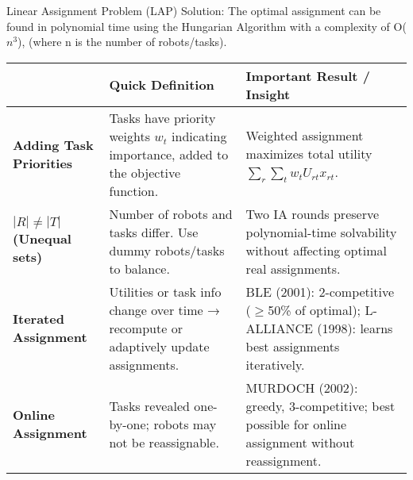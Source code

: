 Linear Assignment Problem (LAP) Solution: The optimal assignment can be found in polynomial time using the Hungarian Algorithm with a complexity of O($n^3$), (where n is the number of robots/tasks).

\begin{table}[h!]
\centering
\renewcommand{\arraystretch}{1.2}
\begin{tabularx}{\textwidth}{@{}p{2.5cm}|p{6.7cm}|X@{}}
\toprule
 & \textbf{Quick Definition} & \textbf{Important Result / Insight} \\ \midrule
\textbf{Adding Task Priorities} & Tasks have priority weights \(w_t\) indicating importance, added to the objective function. & Weighted assignment maximizes total utility \(\sum_r \sum_t w_t U_{rt} x_{rt}\). \\ \addlinespace
\textbf{$|R| \neq |T|$ (Unequal sets)} & Number of robots and tasks differ. Use dummy robots/tasks to balance. & Two IA rounds preserve polynomial-time solvability without affecting optimal real assignments. \\ \addlinespace
\textbf{Iterated Assignment} & Utilities or task info change over time → recompute or adaptively update assignments. & BLE (2001): 2-competitive ($\geq$50\% of optimal); L-ALLIANCE (1998): learns best assignments iteratively. \\ \addlinespace
\textbf{Online Assignment} & Tasks revealed one-by-one; robots may not be reassignable. & MURDOCH (2002): greedy, 3-competitive; best possible for online assignment without reassignment. \\
\bottomrule
\end{tabularx}
\label{tab:st-sr-ia-summary}
\end{table}
